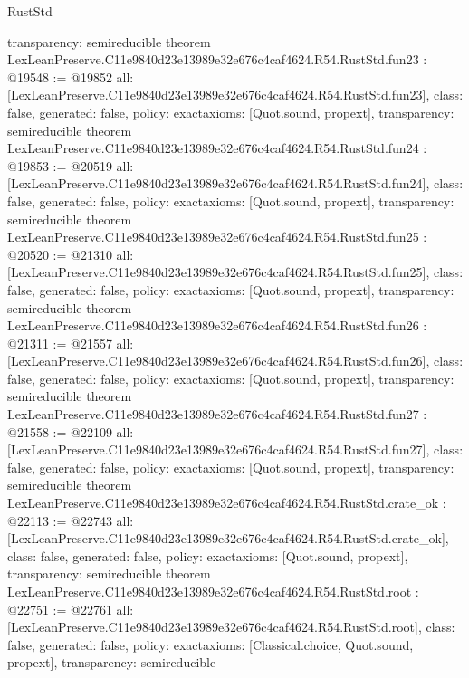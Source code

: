 \begin{lexlean}{RustStd}
\begin{coremodule}
{  transparency: semireducible
}
theorem LexLeanPreserve.C11e9840d23e13989e32e676c4caf4624.R54.RustStd.fun23 : @19548 := @19852 {
  all: [LexLeanPreserve.C11e9840d23e13989e32e676c4caf4624.R54.RustStd.fun23],
  class: false,
  generated: false,
  policy: exact{axioms: [Quot.sound, propext]},
  transparency: semireducible
}
theorem LexLeanPreserve.C11e9840d23e13989e32e676c4caf4624.R54.RustStd.fun24 : @19853 := @20519 {
  all: [LexLeanPreserve.C11e9840d23e13989e32e676c4caf4624.R54.RustStd.fun24],
  class: false,
  generated: false,
  policy: exact{axioms: [Quot.sound, propext]},
  transparency: semireducible
}
theorem LexLeanPreserve.C11e9840d23e13989e32e676c4caf4624.R54.RustStd.fun25 : @20520 := @21310 {
  all: [LexLeanPreserve.C11e9840d23e13989e32e676c4caf4624.R54.RustStd.fun25],
  class: false,
  generated: false,
  policy: exact{axioms: [Quot.sound, propext]},
  transparency: semireducible
}
theorem LexLeanPreserve.C11e9840d23e13989e32e676c4caf4624.R54.RustStd.fun26 : @21311 := @21557 {
  all: [LexLeanPreserve.C11e9840d23e13989e32e676c4caf4624.R54.RustStd.fun26],
  class: false,
  generated: false,
  policy: exact{axioms: [Quot.sound, propext]},
  transparency: semireducible
}
theorem LexLeanPreserve.C11e9840d23e13989e32e676c4caf4624.R54.RustStd.fun27 : @21558 := @22109 {
  all: [LexLeanPreserve.C11e9840d23e13989e32e676c4caf4624.R54.RustStd.fun27],
  class: false,
  generated: false,
  policy: exact{axioms: [Quot.sound, propext]},
  transparency: semireducible
}
theorem LexLeanPreserve.C11e9840d23e13989e32e676c4caf4624.R54.RustStd.crate_ok : @22113 := @22743 {
  all: [LexLeanPreserve.C11e9840d23e13989e32e676c4caf4624.R54.RustStd.crate_ok],
  class: false,
  generated: false,
  policy: exact{axioms: [Quot.sound, propext]},
  transparency: semireducible
}
theorem LexLeanPreserve.C11e9840d23e13989e32e676c4caf4624.R54.RustStd.root : @22751 := @22761 {
  all: [LexLeanPreserve.C11e9840d23e13989e32e676c4caf4624.R54.RustStd.root],
  class: false,
  generated: false,
  policy: exact{axioms: [Classical.choice, Quot.sound, propext]},
  transparency: semireducible
}


\end{coremodule}
\end{lexlean}
